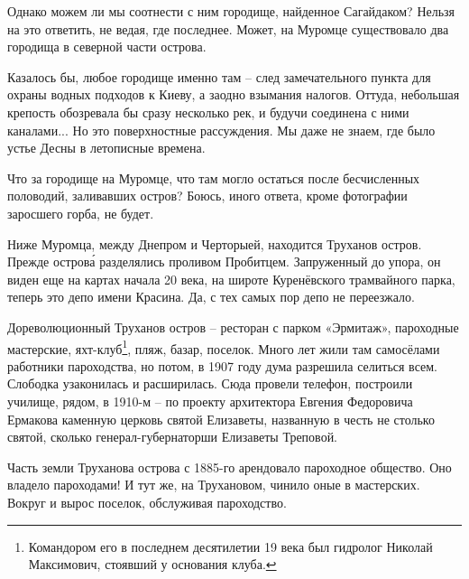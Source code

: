 Однако можем ли мы соотнести с ним городище, найденное Сагайдаком? Нельзя на это ответить, не ведая, где последнее. Может, на Муромце существовало два городища в северной части острова.

Казалось бы, любое городище именно там – след замечательного пункта для охраны водных подходов к Киеву, а заодно взымания налогов. Оттуда, небольшая крепость обозревала бы сразу несколько рек, и будучи соединена с ними каналами... Но это поверхностные рассуждения.
Мы даже не знаем, где было устье Десны в летописные времена.

Что за городище на Муромце, что там могло остаться после бесчисленных половодий, заливавших остров? Боюсь, иного ответа, кроме фотографии заросшего горба, не будет.


Ниже Муромца, между Днепром и Черторыей, находится Труханов остров. Прежде остров\'а разделялись проливом Пробитцем. Запруженный до упора, он виден еще на картах начала 20 века, на широте Куренёвского трамвайного парка, теперь это депо имени Красина. Да, с тех самых пор депо не переезжало.

Дореволюционный Труханов остров – ресторан с парком «Эрмитаж», пароходные мастерские, яхт-клуб\footnote{Командором его в последнем десятилетии 19 века был гидролог Николай Максимович, стоявший у основания клуба.}, пляж, базар, поселок. Много лет жили там самосёлами работники пароходства, но потом, в 1907 году дума разрешила селиться всем. Слободка узаконилась и расширилась. Сюда провели телефон, построили училище, рядом, в 1910-м – по проекту архитектора Евгения Федоровича Ермакова каменную церковь святой Елизаветы, названную в честь не столько святой, сколько генерал-губернаторши Елизаветы Треповой.

Часть земли Труханова острова с 1885-го арендовало пароходное общество. Оно владело пароходами! И тут же, на Трухановом, чинило оные в мастерских. Вокруг и вырос поселок, обслуживая пароходство.

